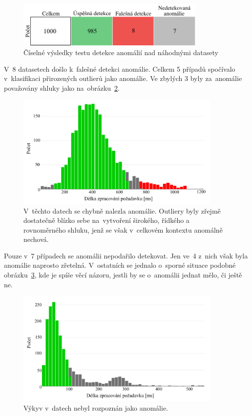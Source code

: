 \begin{figure}[hbt]
    \centering
    \includegraphics[width=0.83\textwidth]{obrazky/result-matrix.pdf}
    \caption{Číselné výsledky testu detekce anomálií nad náhodnými datasety}
    \label{matice-vysledku-img}
\end{figure}

V~8 datasetech došlo k~falešné detekci anomálie. Celkem 5 případů spočívalo v~klasifikaci přirozených outlierů jako anomálie. Ve zbylých 3 byly za~anomálie považovány shluky jako na~obrázku~\ref{chybne-nalezena-anomalie-img}.

\begin{figure}[hbt]
    \centering
    \includegraphics[width=0.9\textwidth]{obrazky/testovani-false-anomaly.pdf}
    \caption{V~těchto datech se chybně nalezla anomálie. Outliery byly zřejmě dostatečně blízko sebe na~vytvoření širokého, řídkého a rovnoměrného shluku, jenž se však v~celkovém kontextu anomálně nechová.}
    \label{chybne-nalezena-anomalie-img}
\end{figure}

Pouze v~7 případech se anomálii nepodařilo detekovat. Jen ve~4 z~nich však byla anomálie naprosto zřetelná. V~ostatních se jednalo o~sporné situace podobné obrázku~\ref{nenalezena-anomalie-img}, kde je spíše věcí názoru, jestli by se o~anomálii jednat mělo, či ještě ne.

\begin{figure}[!hbt]
    \centering
    \includegraphics[width=0.9\textwidth]{obrazky/testovani-unrecognized-anomaly.pdf}
    \caption{Výkyv v~datech nebyl rozpoznán jako anomálie.}
    \label{nenalezena-anomalie-img}
\end{figure}

